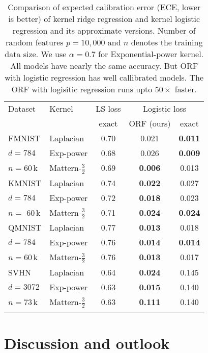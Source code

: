 \documentclass{article}
\theoremstyle{plain}
\begin{document}
\begin{table}[t]
    \centering
    \caption{\label{tab:ece}Comparison of expected calibration error (ECE, lower is better) of kernel ridge regression and kernel logistic regression and its approximate versions. Number of random features $p=10,000$ and $n$ denotes the training data size. We use $\alpha=0.7$ for Exponential-power kernel. All models have nearly the same accuracy. But ORF with logistic regression has well callibrated models. The ORF with logisitic regression runs upto $50\times$ faster.}
    \begin{tabular}{llccc}
    \toprule
        Dataset & Kernel &
        LS loss &   \multicolumn{2}{c}{Logistic loss}\\
        \cmidrule(lr){4-5}
        &
        & exact
        & ORF (ours)
        & exact \\
        \midrule
        FMNIST & Laplacian & 0.70 & 0.021 & \textbf{0.011} \\
        $d=784$ & Exp-power & 0.68 & 0.026&\textbf{0.009}\\
        $n=$60\,{\rm k} & Mattern-$\frac32$   &0.69 & \textbf{0.006}& 0.013 \\
        \midrule
        KMNIST & Laplacian   & 0.74 & \textbf{0.022} & 0.027 \\
        $d=784$ & Exp-power  & 0.72& \textbf{0.018}& 0.023\\
        $n=$ 60\,{\rm k} & Mattern-$\frac32$  & 0.71& \textbf{0.024} & \textbf{0.024}\\
        \midrule
        QMNIST & Laplacian  & 0.77 & \textbf{0.013} & 0.018 \\
        $d=784$ & Exp-power & 0.76& \textbf{0.014}& \textbf{0.014}\\
        $n=$60\,{\rm k} & Mattern-$\frac32$  & 0.76& \textbf{0.013}& 0.017\\
        \midrule
        SVHN & Laplacian   & 0.64 & \textbf{0.024} & 0.145\\
        $d=3072$ & Exp-power & 0.63& \textbf{0.015} & 0.140 \\
        $n=$73\,{\rm k} & Mattern-$\frac32$ & 0.63& \textbf{0.111}& 0.140\\
    \bottomrule
    \vspace{-5ex}
    \end{tabular}
\end{table}

\section{Discussion and outlook}
\end{document}

